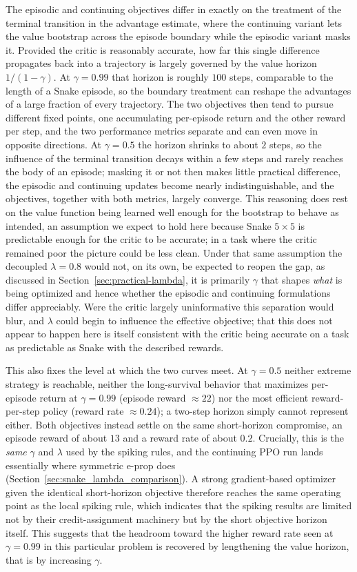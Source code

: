 The episodic and continuing objectives differ in exactly on the treatment of the
terminal transition in the advantage estimate, where the continuing variant lets the value
bootstrap across the episode boundary while the episodic variant masks it. Provided the critic
is reasonably accurate, how far this single difference propagates back into a trajectory is
largely governed by the value horizon $1/(1-\gamma)$. At $\gamma=0.99$ that horizon is roughly
$100$ steps, comparable to the length of a Snake episode, so the boundary treatment can reshape
the advantages of a large fraction of every trajectory. The two objectives then tend to pursue
different fixed points, one accumulating per-episode return and the other reward per step, and
the two performance metrics separate and can even move in opposite directions. At $\gamma=0.5$
the horizon shrinks to about $2$ steps, so the influence of the terminal transition decays
within a few steps and rarely reaches the body of an episode; masking it or not then makes
little practical difference, the episodic and continuing updates become nearly indistinguishable,
and the objectives, together with both metrics, largely converge. This reasoning does rest on the
value function being learned well enough for the bootstrap to behave as intended, an assumption we
expect to hold here because Snake $5\times5$ is predictable enough for the critic to be accurate;
in a task where the critic remained poor the picture could be less clean. Under that same
assumption the decoupled $\lambda=0.8$ would not, on its own, be expected to reopen the gap, as
discussed in Section~\ref{sec:practical-lambda}, it is primarily $\gamma$ that shapes \emph{what} is being optimized and hence
whether the episodic and continuing formulations differ appreciably. Were the critic largely
uninformative this separation would blur, and $\lambda$ could begin to influence the effective
objective; that this does not appear to happen here is itself consistent with the critic being
accurate on a task as predictable as Snake with the described rewards.

This also fixes the level at which the two curves meet. At $\gamma=0.5$ neither extreme strategy
is reachable, neither the long-survival behavior that maximizes per-episode return at
$\gamma=0.99$ (episode reward $\approx 22$) nor the most efficient reward-per-step policy
(reward rate $\approx 0.24$); a two-step horizon simply cannot represent either. Both objectives
instead settle on the same short-horizon compromise, an episode reward of about $13$ and a reward
rate of about $0.2$. Crucially, this is the \emph{same} $\gamma$ and $\lambda$ used by the
spiking rules, and the continuing PPO run lands essentially where symmetric e-prop does
(Section~\ref{sec:snake_lambda_comparison}). A strong gradient-based optimizer given the identical
short-horizon objective therefore reaches the same operating point as the local spiking rule,
which indicates that the spiking results are limited not by their credit-assignment machinery but
by the short objective horizon itself. This suggests that the headroom toward the higher reward rate seen at
$\gamma=0.99$ in this particular problem is recovered by lengthening the value horizon, that is by increasing $\gamma$.


